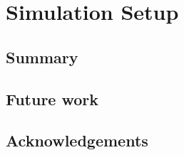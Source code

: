 \section{Simulation Setup}

\subsection*{Summary}


\subsection*{Future work}


\subsection*{Acknowledgements}

